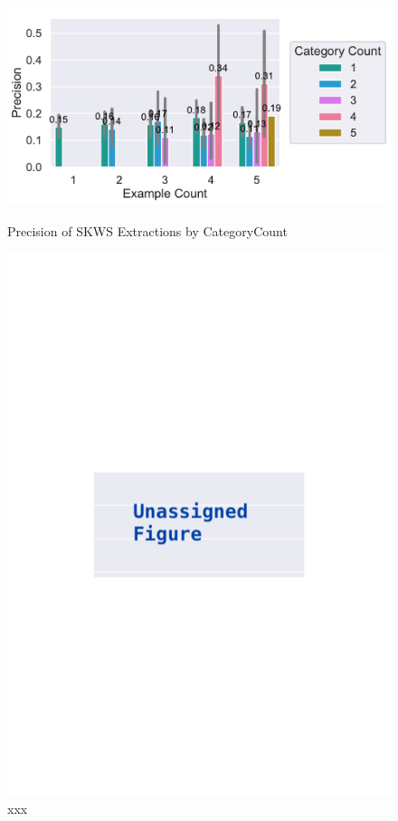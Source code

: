 \documentclass[\myrootdir/main.tex]{subfiles}
\begin{document}
\begin{figure}[htbp]
	\centering
	\begin{minipage}{0.45\textwidth}
		\centering
		\includegraphics[width=\textwidth, clip]{img/big-study/precision-categorycount-examplecount-SKWS.pdf}
		\caption{Precision of SKWS Extractions by CategoryCount}
		\label{fig:precision-categorycount-examplecount-skws}
	\end{minipage}\hfill
	\begin{minipage}{0.45\textwidth}
		\centering
		\includegraphics[width=\textwidth, clip]{img/big-study/xxx.pdf}
		\caption{xxx}
		\label{fig:xxx}
	\end{minipage}
\end{figure}
\end{document}
